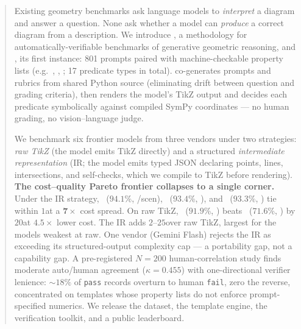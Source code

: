 \begin{abstract}
Existing geometry benchmarks ask language models to \emph{interpret} a diagram and answer a question.
None ask whether a model can \emph{produce} a correct diagram from a description.
We introduce \textbf{\GeoGen}, a methodology for automatically-verifiable benchmarks of generative geometric reasoning, and \textbf{\GeoGenBench}, its first instance: 801 prompts paired with machine-checkable property lists (e.g.\ , , ; 17 predicate types in total).
\GeoGen co-generates prompts and rubrics from shared Python source (eliminating drift between question and grading criteria), then renders the model's TikZ output and decides each predicate symbolically against compiled SymPy coordinates --- no human grading, no vision--language judge.

We benchmark six frontier models from three vendors under two strategies: \emph{raw TikZ} (the model emits TikZ directly) and a structured \emph{intermediate representation} (IR; the model emits typed JSON declaring points, lines, intersections, and self-checks, which we compile to TikZ before rendering).
\textbf{The cost--quality Pareto frontier collapses to a single corner.}
Under the IR strategy, \gpt\ ($94.1$\%, /scen), \sonnet\ ($93.4$\%, ), and \opus\ ($93.3$\%, ) tie within $1$\pp at a $\mathbf{7\times}$ cost spread.
On raw TikZ, \gpt\ ($91.9$\%, ) beats \opus\ ($71.6$\%, ) by $20$\pp at $4.5\times$ lower cost.
The IR adds $2$--$25$\pp over raw TikZ, largest for the models weakest at raw.
One vendor (Gemini Flash) rejects the IR as exceeding its structured-output complexity cap --- a portability gap, not a capability gap.
A pre-registered $N{=}200$ human-correlation study finds moderate auto/human agreement ($\kappa{=}0.455$) with one-directional verifier lenience: $\sim 18\%$ of \texttt{pass} records overturn to human \texttt{fail}, zero the reverse, concentrated on templates whose property lists do not enforce prompt-specified numerics.
We release the dataset, the template engine, the verification toolkit, and a public leaderboard.
\end{abstract}
